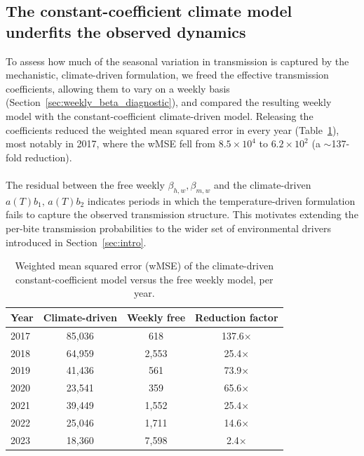 \documentclass[a4paper,fleqn]{cas-dc}
\begin{document}
\subsection{The constant-coefficient climate model underfits the observed dynamics}
\label{sec:results_weekly_beta}
To assess how much of the seasonal variation in transmission is captured by the mechanistic, climate-driven formulation, we freed the effective transmission coefficients, allowing them to vary on a weekly basis (Section~\ref{sec:weekly_beta_diagnostic}), and compared the resulting weekly model with the constant-coefficient climate-driven model. Releasing the coefficients reduced the weighted mean squared error in every year (Table~\ref{tbl:weekly_beta}), most notably in 2017, where the wMSE fell from $8.5\times10^4$ to $6.2\times10^2$ (a $\sim$137-fold reduction).
\\\\
The residual between the free weekly $\beta_{h,w},\beta_{m,w}$ and the climate-driven $a(T)b_1,\,a(T)b_2$ indicates periods in which the temperature-driven formulation fails to capture the observed transmission structure. This motivates extending the per-bite transmission probabilities to the wider set of environmental drivers introduced in Section~\ref{sec:intro}.
\begin{table}[H]
\centering
\caption{Weighted mean squared error (wMSE) of the climate-driven constant-coefficient model versus the free weekly model, per year.}
\label{tbl:weekly_beta}
\begin{tabular}{lccc}
\toprule
Year & Climate-driven & Weekly free & Reduction factor \\
\midrule
2017 & 85,036 & 618 & 137.6$\times$\\
2018 & 64,959 & 2,553 & 25.4$\times$\\
2019 & 41,436 & 561 & 73.9$\times$\\
2020 & 23,541 & 359 & 65.6$\times$\\
2021 & 39,449 & 1,552 & 25.4$\times$\\
2022 & 25,046 & 1,711 & 14.6$\times$\\
2023 & 18,360 & 7,598 & 2.4$\times$\\
\bottomrule
\end{tabular}
\end{table}
\end{document}
